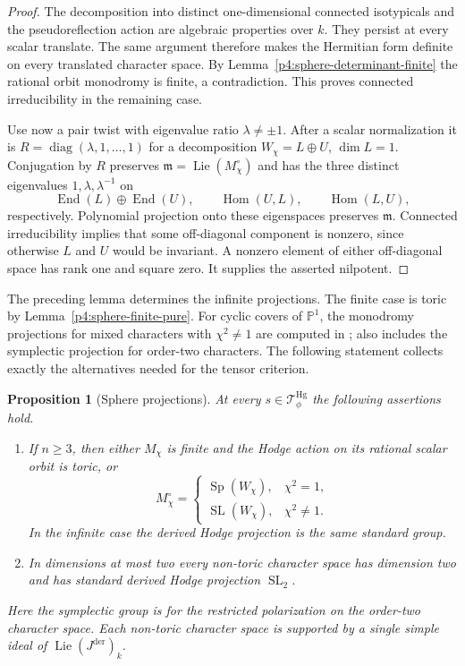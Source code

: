 \documentclass[11pt]{article}
\newcommand{\PP}{\mathbb P}
\theoremstyle{plain}
\newtheorem{proposition}[theorem]{Proposition}
\theoremstyle{definition}
\theoremstyle{remark}
\numberwithin{equation}{section}
\begin{document}
\begin{proof}
The decomposition into distinct one-dimensional connected
isotypicals and the pseudoreflection action are algebraic
properties over $k$.  They persist at every scalar translate.
The same argument therefore makes the Hermitian form definite on
every translated character space.  By
Lemma~\ref{p4:sphere-determinant-finite} the rational orbit
monodromy is finite, a contradiction.  This proves connected
irreducibility in the remaining case.

Use now a pair twist with eigenvalue ratio
$\lambda\ne\pm1$.  After a scalar normalization it is
$R=\operatorname{diag}(\lambda,1,\ldots,1)$ for a decomposition
$W_\chi=L\oplus U$, $\dim L=1$.  Conjugation by $R$ preserves
$\mathfrak m=\operatorname{Lie}(M_\chi^\circ)$ and has the three distinct
eigenvalues $1,\lambda,\lambda^{-1}$ on
\[
 \operatorname{End}(L)\oplus\operatorname{End}(U),\qquad
 \operatorname{Hom}(U,L),\qquad \operatorname{Hom}(L,U),
\]
respectively.  Polynomial projection onto these eigenspaces
preserves $\mathfrak m$.  Connected irreducibility implies that
some off-diagonal component is nonzero, since otherwise $L$ and
$U$ would be invariant.  A nonzero element of either off-diagonal
space has rank one and square zero.  It supplies the asserted
nilpotent.
\end{proof}

The preceding lemma determines the infinite projections.  The finite
case is toric by Lemma~\ref{p4:sphere-finite-pure}.
For cyclic covers of $\PP^1$, the monodromy projections for mixed
characters with $\chi^2\ne1$ are computed in
\cite[preprint, Theorem~5.1.1]{Rohde2009};
\cite[Proposition~4.7]{Moonen2010} also includes the symplectic
projection for order-two characters.  The following
statement collects exactly the alternatives needed for the tensor
criterion.

\begin{proposition}[Sphere projections]\label{p4:sphere-projections}
At every $s\in\mathcal T_\phi^{\mathrm{Hg}}$ the following assertions hold.
\begin{enumerate}[label=\textup{(\roman*)}]
\item If $n\ge3$, then either $M_\chi$ is finite and the Hodge
action on its rational scalar orbit is toric, or
\[
 M_\chi^\circ=
 \begin{cases}
  \operatorname{Sp}(W_\chi),&\chi^2=1,\\
  \operatorname{SL}(W_\chi),&\chi^2\ne1.
 \end{cases}
\]
In the infinite case the derived Hodge projection is the same
standard group.
\item In dimensions at most two every non-toric character space
has dimension two and has standard derived Hodge projection
$\operatorname{SL}_2$.
\end{enumerate}
Here the symplectic group is for the restricted polarization on
the order-two character space.  Each non-toric character space
is supported by a single simple ideal of $\operatorname{Lie}(J^{\mathrm{der}})_k$.
\end{proposition}
\end{document}

